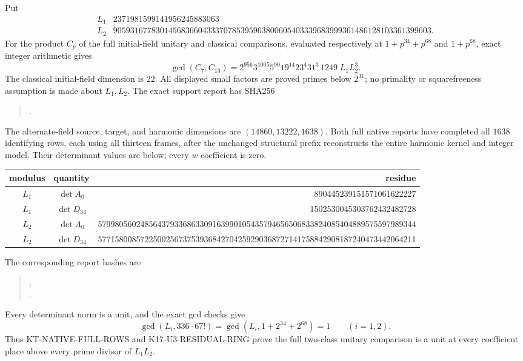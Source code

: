 \documentclass[11pt,a4paper]{article}
\theoremstyle{definition}
\begin{document}
Put
\[
\begin{array}{c|r}
 L_1&2371981599141956245883063\\
 L_2&905931677830145683660433370785395963800605403339683999361486128103361399603.
\end{array}                                                    \tag{KL.1}
\]
For the product $C_p$ of the full initial-field unitary and
classical comparisons, evaluated respectively at
$1+p^{34}+p^{68}$ and $1+p^{68}$, exact integer arithmetic gives
\[
 \gcd(C_7,C_{13})
       =2^{956}3^{1005}5^{90}19^{14}23^4 31^3\,1249
                                                    \;L_1L_2^3.
                                                               \tag{KL.2}
\]
The classical initial-field dimension is $22$.  All displayed
small factors are proved primes below $2^{31}$; no primality
or squarefreeness assumption is made about $L_1,L_2$.
The exact support report has SHA256
\begin{quote}\small
{}.
\end{quote}

The alternate-field source, target, and harmonic dimensions
are $(14860,13222,1638)$.  Both full native reports have
completed all $1638$ identifying rows, each using all thirteen
frames, after the unchanged structural prefix reconstructs
the entire harmonic kernel and integer model.  Their
determinant values are below; every $w$ coefficient is zero.
\begin{center}\footnotesize
\begin{tabular}{c|c|r}
modulus&quantity&residue\\\hline
$L_1$&$\det A_0$&890445239151571061622227\\
$L_1$&$\det D_{34}$&1502530045303762432482728\\
$L_2$&$\det A_0$&579980560248564379336863309163990105435794656506833824085404889575597989344\\
$L_2$&$\det D_{34}$&577158008572250025673753936842704259290368727141758842908187240473442064211
\end{tabular}
\end{center}
The corresponding report hashes are
\begin{quote}\small
{},\\
.
\end{quote}
Every determinant norm is a unit, and the exact gcd checks give
\[
 \gcd(L_i,336\cdot67!)=
 \gcd(L_i,1+2^{34}+2^{68})=1\qquad(i=1,2).                  \tag{KL.3}
\]
Thus KT-NATIVE-FULL-ROWS and K17-U3-RESIDUAL-RING prove
the full two-class unitary comparison is a unit at every
coefficient place above every prime divisor of $L_1L_2$.
\end{document}
